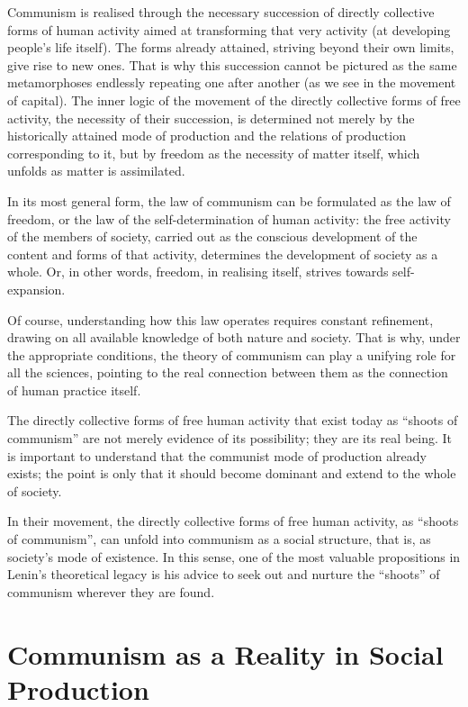\documentclass[12pt,a4paper,openany]{book}
\begin{document}
Communism is realised through the necessary succession of directly collective forms of human activity aimed at transforming that very activity (at developing people’s life itself). The forms already attained, striving beyond their own limits, give rise to new ones. That is why this succession cannot be pictured as the same metamorphoses endlessly repeating one after another (as we see in the movement of capital). The inner logic of the movement of the directly collective forms of free activity, the necessity of their succession, is determined not merely by the historically attained mode of production and the relations of production corresponding to it, but by freedom as the necessity of matter itself, which unfolds as matter is assimilated.

In its most general form, the law of communism can be formulated as the law of freedom, or the law of the self-determination of human activity: the free activity of the members of society, carried out as the conscious development of the content and forms of that activity, determines the development of society as a whole. Or, in other words, freedom, in realising itself, strives towards self-expansion.

Of course, understanding how this law operates requires constant refinement, drawing on all available knowledge of both nature and society. That is why, under the appropriate conditions, the theory of communism can play a unifying role for all the sciences, pointing to the real connection between them as the connection of human practice itself.

The directly collective forms of free human activity that exist today as “shoots of communism” are not merely evidence of its possibility; they are its real being. It is important to understand that the communist mode of production already exists; the point is only that it should become dominant and extend to the whole of society.

In their movement, the directly collective forms of free human activity, as “shoots of communism”, can unfold into communism as a social structure, that is, as society’s mode of existence. In this sense, one of the most valuable propositions in Lenin’s theoretical legacy is his advice to seek out and nurture the “shoots” of communism wherever they are found.
\ifSubfilesClassLoaded{\setcounter{page}{19}}{}
\section{Communism as a Reality in Social Production}
\label{sec:04_communism_reality}
\end{document}
